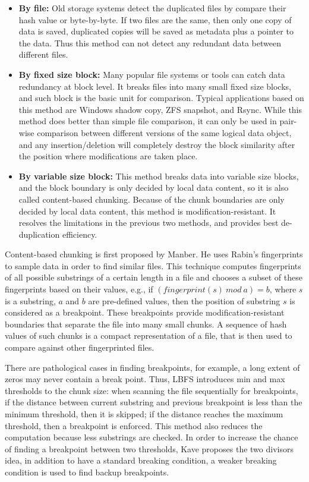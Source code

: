\begin{itemize}
\item \textbf{By file:} Old storage systems detect the duplicated files by compare their hash value
or byte-by-byte. If two files are the same, then only one copy of data is saved, duplicated
copies will be saved as metadata plus a pointer to the data. Thus this method can not detect any redundant data
between different files.

\item \textbf{By fixed size block:} Many popular file systems or tools can catch data redundancy at block level.
It breaks files into many small fixed size blocks, and such block is the basic unit 
for comparison. Typical applications based on this method are Windows shadow copy, ZFS\cite{zfs} snapshot, and Rsync\cite{rsync}. 
While this method does better than simple file comparison, it can only be used in pair-wise comparison
between different versions of
the same logical data object, and any insertion/deletion will completely destroy the block similarity after the position
where modifications are taken place.

\item \textbf{By variable size block:} This method breaks data into variable size blocks, and the block boundary
is only decided by local data content, so it is also called content-based chunking. 
Because of the chunk boundaries are only decided by local data content,
this method is modification-resistant. It resolves the
limitations in the previous two methods, and provides
best de-duplication efficiency. 
\end{itemize} 

Content-based chunking is first proposed by Manber\cite{similar94}.
He uses Rabin's fingerprints\cite{rabin81, identify00} to sample
data in order to find similar files. This technique computes
fingerprints of all possible substrings of a certain
length in a file and chooses a subset of these fingerprints
based on their values,  e.g., if $(fingerprint(s)\ mod\ a) = b$, where
$s$ is a substring,
$a$ and $b$ are pre-defined values, then the position of substring $s$
is considered as a breakpoint. 
These breakpoints provide 
modification-resistant boundaries that separate the file
into many small chunks. A sequence of hash values of such chunks
is a compact representation of a file, that is then used to compare
against other fingerprinted files.

There are pathological cases in finding breakpoints, for example,
a long extent of zeros may never contain a break point. Thus, LBFS\cite{lbfs01}
introduces min and max thresholds to the chunk size: when scanning the file
sequentially for breakpoints, if the distance between current substring 
and previous breakpoint is less than the minimum threshold, then it is skipped;
if the distance reaches the maximum threshold, then a breakpoint
is enforced. This method also reduces the computation because less substrings
are checked. In order to increase the chance of finding a breakpoint between
two thresholds, Kave\cite{frame05}
proposes the two divisors idea, in addition to have a standard breaking condition,
a weaker breaking condition is used to find backup breakpoints.

